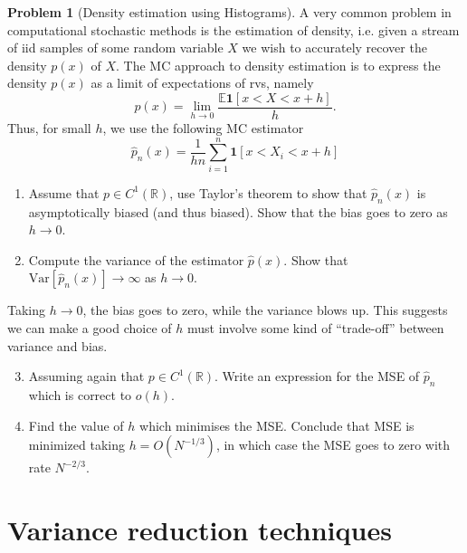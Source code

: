 \documentclass[11pt,a4paper]{article}
\theoremstyle{definition}
\newtheorem{problem}{Problem}
\theoremstyle{plain}
\begin{document}
\begin{problem}[Density estimation using Histograms]
A very common problem in computational stochastic methods is the estimation of density, i.e. given a stream of iid samples of some random variable $X$ we wish to accurately recover the density $p(x)$ of $X$.  The MC approach to density estimation is to express the density $p(x)$ as a limit of expectations of rvs, namely
$$
  p(x) = \lim_{h\rightarrow 0}\frac{\mathbb{E}\mathbf{1}\left[x < X < x + h\right]}{h}.
$$
Thus, for small $h$, we use the following MC estimator
$$
  \hat{p}_n(x) = \frac{1}{hn}\sum_{i=1}^{n} \mathbf{1}\left[x < X_i < x+h\right]
$$
\begin{enumerate}
\item  Assume that $p \in C^1(\mathbb{R})$, use Taylor's theorem to show that $\hat{p}_n(x)$ is asymptotically biased (and thus biased).   Show that the bias goes to zero as $h \rightarrow 0$.
\item Compute the variance of the estimator $\hat{p}(x)$.  Show that $\mbox{Var}[\hat{p}_n(x)] \rightarrow \infty$ as $h \rightarrow 0$.
\end{enumerate}
Taking $h\rightarrow 0$, the bias goes to zero, while the variance blows up.  This suggests we can make a good choice of $h$ must involve some kind  of ``trade-off'' between variance and bias.
\begin{enumerate}
  \setcounter{enumi}{2}
  \item Assuming again that $p \in C^1(\mathbb{R})$.  Write an expression for the MSE of $\hat{p}_n$ which is correct  to $o(h)$.
  \item  Find the value of $h$ which minimises the MSE.
      Conclude that MSE is minimized taking $h = O(N^{-1/3})$,
      in which case the MSE goes to zero with rate $N^{-2/3}$.
\end{enumerate}
\end{problem}


\section*{Variance reduction techniques}%
\label{sec:variance_reduction_techniques}
\end{document}
